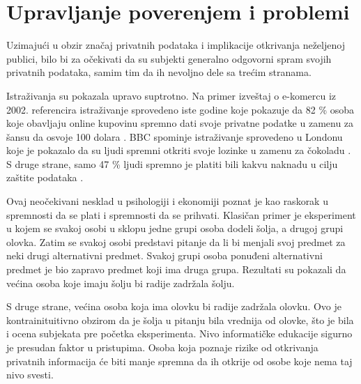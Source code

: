 \documentclass[a4paper]{article}
\begin{document}
\section{Upravljanje poverenjem i problemi}	
Uzimajući u obzir značaj privatnih podataka i implikacije otkrivanja neželjenoj publici, bilo bi za očekivati da su subjekti generalno odgovorni spram svojih privatnih podataka, samim tim da ih nevoljno dele sa trećim stranama. \par Istraživanja su pokazala upravo suptrotno. Na primer izveštaj o e-komercu iz 2002. referencira istraživanje sprovedeno iste godine koje pokazuje da 82 \% osoba koje obavljaju online kupovinu spremno dati svoje privatne podatke u zamenu za šansu da osvoje 100 dolara \cite{Tedeschi}. BBC spominje istraživanje sprovedeno u Londonu koje je pokazalo da su ljudi spremni otkriti svoje lozinke u zamenu za čokoladu \cite{BBC}. S druge strane, samo 47 \% ljudi spremno je platiti bili kakvu naknadu u cilju zaštite podataka \cite{Consumers}. \par Ovaj neočekivani nesklad u psihologiji i  ekonomiji poznat je kao raskorak u spremnosti da se plati i spremnosti da se prihvati. Klasičan primer je eksperiment u kojem se svakoj osobi u sklopu jedne grupi osoba dodeli šolja, a drugoj grupi olovka. Zatim se svakoj osobi
predstavi pitanje da li bi menjali svoj predmet za neki drugi alternativni predmet. Svakoj grupi osoba ponuđeni alternativni predmet je bio zapravo predmet koji ima druga grupa. Rezultati su pokazali da većina osoba koje imaju šolju bi radije zadržala šolju. \par S druge strane, većina osoba koja ima olovku bi radije zadržala olovku. Ovo je kontrainituitivno obzirom da je šolja u pitanju bila vrednija od olovke, što je bila i ocena subjekata pre početka eksperimenta. Nivo informatičke edukacije sigurno je presudan faktor u pristupima. Osoba koja poznaje rizike od otkrivanja privatnih informacija će biti manje spremna da ih otkrije od osobe koje nema taj nivo svesti. 
\end{document}
